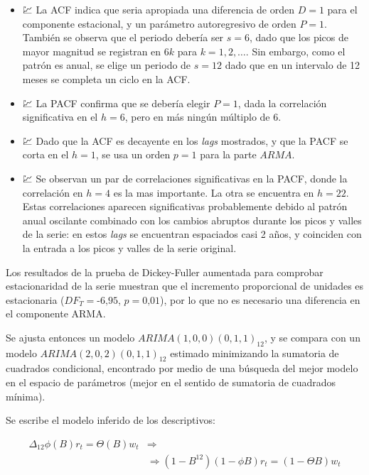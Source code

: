 \documentclass[]{article}
\providecommand{\tightlist}{%
  \setlength{\itemsep}{0pt}\setlength{\parskip}{0pt}}
\begin{document}
\begin{itemize}
\tightlist
\item
  💹 La ACF indica que seria apropiada una diferencia de orden \(D=1\) para el componente estacional, y un parámetro autoregresivo de orden \(P=1\). También se observa que el periodo debería ser \(s=6\), dado que los picos de mayor magnitud se registran en \(6k\) para \(k=1,2,\ldots\). Sin embargo, como el patrón es anual, se elige un periodo de \(s=12\) dado que en un intervalo de 12 meses se completa un ciclo en la ACF.
\item
  💹 La PACF confirma que se debería elegir \(P=1\), dada la correlación significativa en el \(h=6\), pero en más ningún múltiplo de 6.
\item
  💹 Dado que la ACF es decayente en los \emph{lags} mostrados, y que la PACF se corta en el \(h=1\), se usa un orden \(p=1\) para la parte \(ARMA\).
\item
  💹 Se observan un par de correlaciones significativas en la PACF, donde la correlación en \(h=4\) es la mas importante. La otra se encuentra en \(h=22\). Estas correlaciones aparecen significativas probablemente debido al patrón anual oscilante combinado con los cambios abruptos durante los picos y valles de la serie: en estos \emph{lags} se encuentran espaciados casi 2 años, y coinciden con la entrada a los picos y valles de la serie original.
\end{itemize}

Los resultados de la prueba de Dickey-Fuller aumentada para comprobar estacionaridad de la serie muestran que el incremento proporcional de unidades es estacionaria (\(DF_T=\text{-6,95}\), \(p=\text{0,01}\)), por lo que no es necesario una diferencia en el componente ARMA.

Se ajusta entonces un modelo \(ARIMA(1, 0, 0)(0, 1, 1)_{12}\), y se compara con un modelo \(ARIMA(2, 0, 2)(0, 1, 1)_{12}\) estimado minimizando la sumatoria de cuadrados condicional, encontrado por medio de una búsqueda del mejor modelo en el espacio de parámetros (mejor en el sentido de sumatoria de cuadrados mínima).

Se escribe el modelo inferido de los descriptivos:

\[
\begin{aligned}
  \Delta_{12}\phi(B)r_t = \Theta(B) w_t  & \Rightarrow \\
    & \Rightarrow (1 - B^12)(1 - \phi B) r_t = (1 - \Theta B) w_t \\
\end{aligned}
\]
\end{document}
